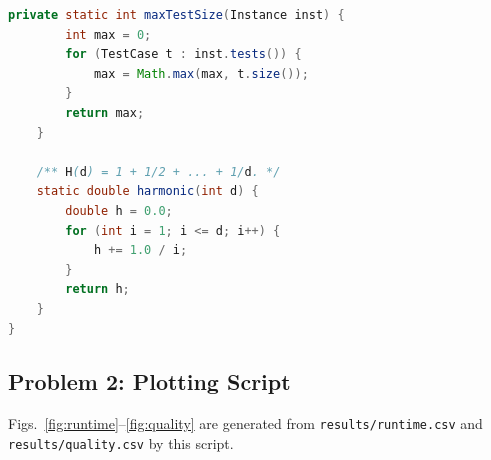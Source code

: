 \documentclass[conference]{IEEEtran}
\theoremstyle{definition}
\theoremstyle{remark}
\begin{document}
\begin{lstlisting}[style=code,language=Java]
    private static int maxTestSize(Instance inst) {
        int max = 0;
        for (TestCase t : inst.tests()) {
            max = Math.max(max, t.size());
        }
        return max;
    }

    /** H(d) = 1 + 1/2 + ... + 1/d. */
    static double harmonic(int d) {
        double h = 0.0;
        for (int i = 1; i <= d; i++) {
            h += 1.0 / i;
        }
        return h;
    }
}
\end{lstlisting}


\subsection{Problem 2: Plotting Script}
Figs.~\ref{fig:runtime}--\ref{fig:quality} are generated from
\texttt{results/runtime.csv} and \texttt{results/quality.csv} by this script.
\end{document}
